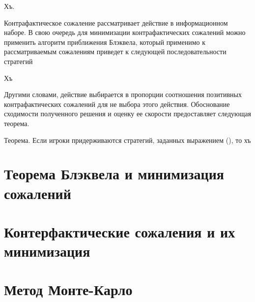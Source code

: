 Хъ. 

Контрафактическое сожаление рассматривает действие в информационном наборе. В свою очередь для минимизации контрафактических сожалений можно применить алгоритм приближения Блэквела, который применимо к рассматриваемым сожалениям приведет к следующей последовательности стратегий 

Хъ 

Другими словами, действие выбирается в пропорции соотношения позитивных контрафактических сожалений для не выбора этого действия. Обоснование сходимости полученного решения и оценку ее скорости предоставляет следующая теорема. 

Теорема. Если игроки придерживаются стратегий, заданных выражением (), то хъ 
\section{Теорема Блэквела и минимизация сожалений}
\section{Контерфактические сожаления и их минимизация}
\section{Метод Монте-Карло}